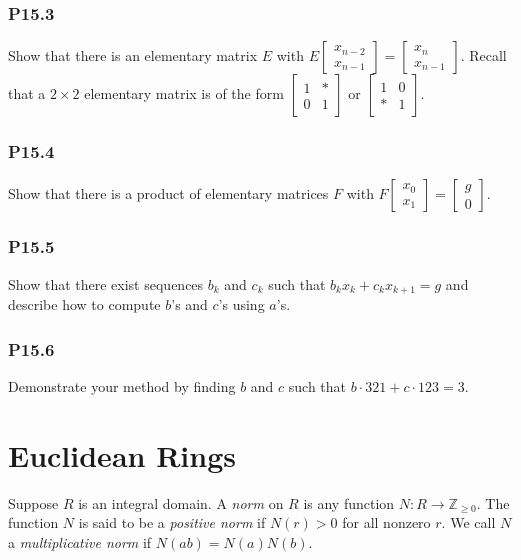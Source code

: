 \documentclass[lang=cn,11pt]{template}
\begin{document}
\subsection*{P15.3} Show that there is an elementary matrix \( E \) with \( E \begin{bmatrix} x_{n-2} \\ x_{n-1} \end{bmatrix} = \begin{bmatrix} x_n \\ x_{n-1} \end{bmatrix} \). Recall that a \( 2 \times 2 \) elementary matrix is of the form \( \begin{bmatrix} 1 & * \\ 0 & 1 \end{bmatrix} \) or \( \begin{bmatrix} 1 & 0 \\ * & 1 \end{bmatrix} \).

\subsection*{P15.4} Show that there is a product of elementary matrices \( F \) with \( F \begin{bmatrix} x_0 \\ x_1 \end{bmatrix} = \begin{bmatrix} g \\ 0 \end{bmatrix} \).

\subsection*{P15.5} Show that there exist sequences \( b_k \) and \( c_k \) such that \( b_k x_k + c_k x_{k+1} = g \) and describe how to compute \( b \)'s and \( c \)'s using \( a \)'s.

\subsection*{P15.6} Demonstrate your method by finding \( b \) and \( c \) such that \( b \cdot 321 + c \cdot 123 = 3 \).

\chapter{Euclidean Rings}

\begin{definition}
Suppose \( R \) is an integral domain. A \textit{norm} on \( R \) is any function \( N : R \to \mathbb{Z}_{\geq 0} \). The function \( N \) is said to be a \textit{positive norm} if \( N(r) > 0 \) for all nonzero \( r \). We call \( N \) a \textit{multiplicative norm} if \( N(ab) = N(a)N(b) \).
\end{definition}
\end{document}
